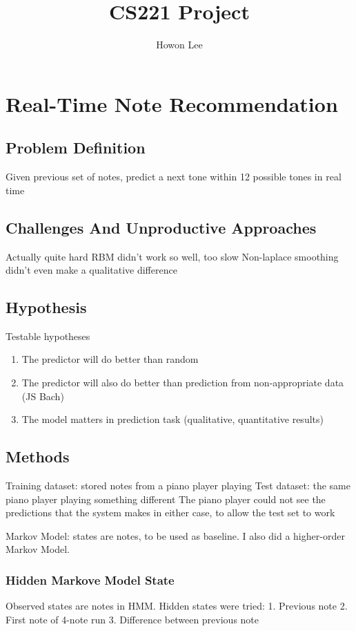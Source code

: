 \documentclass{article}
\begin{document}
\title{CS221 Project}
\author{Howon Lee}
\maketitle
\section*{Real-Time Note Recommendation}

\subsection*{Problem Definition}
Given previous set of notes, predict a next tone within 12 possible tones in real time

\subsection*{Challenges And Unproductive Approaches}
Actually quite hard
RBM didn't work so well, too slow
Non-laplace smoothing didn't even make a qualitative difference

\subsection*{Hypothesis}

Testable hypotheses
\begin{enumerate}
    \item The predictor will do better than random
    \item The predictor will also do better than prediction from non-appropriate data (JS Bach)
    \item The model matters in prediction task (qualitative, quantitative results)
\end{enumerate}

\subsection*{Methods}
Training dataset: stored notes from a piano player playing
Test dataset: the same piano player playing something different
The piano player could not see the predictions that the system makes in either case, to allow the test set to work

Markov Model: states are notes, to be used as baseline. I also did a higher-order Markov Model.

\subsubsection*{Hidden Markove Model State}
Observed states are notes in HMM.
Hidden states were tried:
1. Previous note
2. First note of 4-note run
3. Difference between previous note
\end{document}
